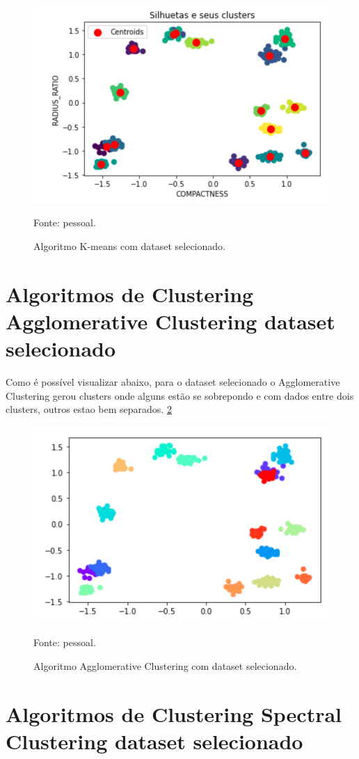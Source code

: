 \begin{figure}[h]
	\centering
	\includegraphics[width=0.7\linewidth]{images/kmeansSelecionado}
	\caption{Algoritmo K-means com dataset selecionado.}
	Fonte: pessoal.
	\label{fig:kmeansSelecionado}
\end{figure}

\section{Algoritmos de Clustering Agglomerative Clustering dataset selecionado}

Como é possível visualizar abaixo, para o dataset selecionado o Agglomerative Clustering gerou clusters onde alguns estão se sobrepondo e com dados entre dois clusters, outros estao bem separados. \ref{fig:aglometariveClusteringSelecionado}

\begin{figure}[h]
	\centering
	\includegraphics[width=0.7\linewidth]{images/aglometariveClusteringSelecionado}
	\caption{Algoritmo Agglomerative Clustering com dataset selecionado.}
	Fonte: pessoal.
	\label{fig:aglometariveClusteringSelecionado}
\end{figure}


\section{Algoritmos de Clustering Spectral Clustering dataset selecionado}

